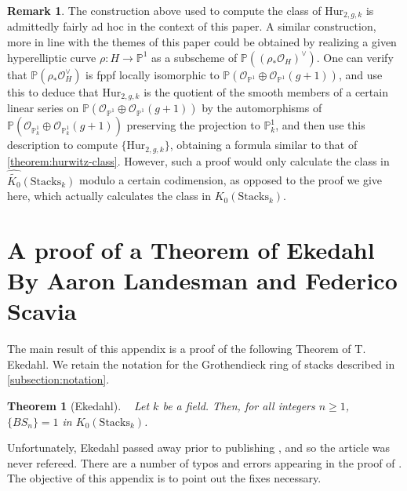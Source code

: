 \documentclass[12 pt]{amsart}
\theoremstyle{plain}
\newtheorem{theorem}[subsection]{Theorem}
\theoremstyle{definition}
\newtheorem{remark}[theorem]{Remark}
\theoremstyle{remark}
\numberwithin{equation}{section}
\newcommand\bp{\mathbb P}
\newcommand\sco{\mathscr O}
\newcommand \ra{\rightarrow}
\newcommand\hur[3]{\mathrm{Hur}_{#1,#2,#3}} %
\newcommand\grcSpaces{\widehat{\widetilde{K_0}}(\mathrm{Spaces}_k)} %
\newcommand\grStacks{K_0(\mathrm{Stacks}_k)} %
\newcommand\grcStacks{\widehat{\widetilde{K_0}}(\mathrm{Stacks}_k)} %
\begin{document}
\begin{remark} \label{remark:} The construction
	above used to compute the class of $\hur 2 g k$ is admittedly fairly ad
	hoc in the context of this paper.  A similar construction, more in line
	with the themes of this paper could be obtained by realizing a given
	hyperelliptic curve $\rho: H \ra \bp^1$ as a subscheme of $\bp (
	\left(\rho_* \sco_H \right)^\vee)$.  One can verify that $\bp (\rho_*
	\sco_H^\vee)$ is fppf locally isomorphic to $\bp\left( \sco_{\bp^1}
	\oplus \sco_{\bp^1}(g+1) \right)$, and use this to deduce that $\hur 2 g
	k$ is the quotient of the smooth members of a certain linear series on
	$\bp\left( \sco_{\bp^1} \oplus \sco_{\bp^1}(g+1) \right)$ by the
	automorphisms of $\bp\left( \sco_{\bp^1_k} \oplus \sco_{\bp^1_k}(g+1)
	\right)$ preserving the projection to $\bp^1_k$, and then use this
	description to compute $\{\hur 2 g k\}$, obtaining a formula similar to
	that of
	\autoref{theorem:hurwitz-class}.
	However, such a proof would only calculate the class in $\grcStacks$
	modulo a certain codimension, as opposed to the proof we give here,
	which actually calculates the class in $\grStacks$.
\end{remark}

\appendix
\section{A proof of a Theorem of Ekedahl \\ By Aaron Landesman and Federico Scavia}


	\maketitle
	The main result of this appendix is a proof of the following Theorem of T. Ekedahl. 
	We retain the notation for the Grothendieck ring of stacks described in
	\autoref{subsection:notation}.
	\begin{theorem}[Ekedahl]\label{ekedahl}~
		Let $k$ be a field. Then, for all integers $n \geq 1$,
		$\{BS_n\}=1$ in $\grStacks$.
	\end{theorem}
	
	Unfortunately, Ekedahl passed away prior to publishing \cite{ekedahlGeometricInvariantFinite2009}, and so the article was never refereed. 
	There are a number of typos and errors appearing in the proof of \cite[Thm.\ 4.3]{ekedahlGeometricInvariantFinite2009}. The objective of this appendix is to point out the fixes necessary.
	
\end{document}
